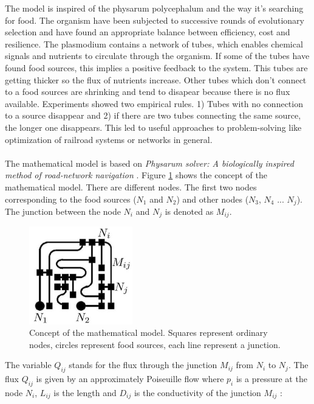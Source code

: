 \documentclass[11pt]{article}
\begin{document}
The model is inspired of the physarum polycephalum and the way it's searching for food. The organism have been subjected to successive rounds of evolutionary selection and have found an appropriate balance between efficiency, cost and resilience. The plasmodium contains a network of tubes, which enables chemical signals and nutrients to circulate through the organism. If some of the tubes have found food sources, this implies a positive feedback to the system. This tubes are getting thicker so the flux of nutrients increase. Other tubes which don't connect to a food sources are shrinking and tend to disapear because there is no flux available. Experiments showed two empirical rules. 1) Tubes with no connection to a source disappear and 2) if there are two tubes connecting the same source, the longer one disappears. This led to useful approaches to problem-solving like optimization of railroad systems or networks in general.~\\
~\\
The mathematical model is based on \textit{Physarum solver: A biologically inspired method of road-network navigation} \cite{network_model}. Figure \ref{fig:schema} shows the concept of the mathematical model. There are different nodes. The first two nodes corresponding to the food sources ($N_1$ and $N_2$) and other nodes ($N_3$, $N_4$ ... $N_j$). The junction between the node $N_i$ and $N_j$ is denoted as $M_{ij}$.

\begin{figure}[H]
	\centering
	\includegraphics[width=0.4\textwidth]{schema.jpg}
	\caption{Concept of the mathematical model. Squares represent ordinary nodes, circles 			represent food sources, each line represent a junction.}
	\label{fig:schema}
\end{figure}

The variable $Q_{ij}$ stands for the flux through the junction $M_{ij}$ from $N_i$ to $N_j$. The flux $Q_{ij}$ is given by an approximately Poiseuille flow where $p_i$ is a pressure at the node $N_i$, $L_{ij}$ is the length and $D_{ij}$ is the conductivity of the junction $M_{ij}$ :
\end{document}
